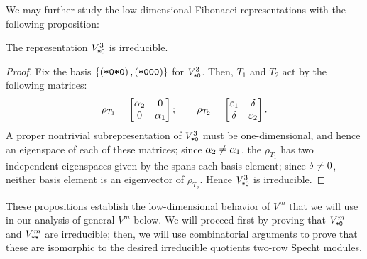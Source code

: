 \documentclass{amsart}
\begin{document}
We may further study the low-dimensional Fibonacci representations with the following proposition:
\begin{proposition}
  The representation \emph{$V^3_{\texttt{*}\texttt{0}}$} is irreducible.
\end{proposition}
\begin{proof}
  Fix the basis $\left\{ \left( \texttt{*}\texttt{0}\texttt{*}\texttt{0} \right), \left( \texttt{*}\texttt{0}\texttt{0}\texttt{0} \right) \right\}$ for $V^3_{\texttt{*}\texttt{0}}$.
  Then, $T_1$ and $T_2$ act by the following matrices:
\[
  \rho_{T_1} = \begin{bmatrix}
    \alpha_2 & 0\\
    0 & \alpha_1
  \end{bmatrix}; \hspace{20pt}
  \rho_{T_2} = \begin{bmatrix}
    \varepsilon_1 & \delta\\
    \delta & \varepsilon_2
  \end{bmatrix}.
\]
  A proper nontrivial subrepresentation of $V_{\texttt{*}\texttt{0}}^3$ must be one-dimensional, and hence an eigenspace of each of these matrices;
  since $\alpha_2 \neq \alpha_1$, the $\rho_{T_1}$ has two independent eigenspaces given by the spans each basis element; since $\delta \neq 0$, neither basis element is an eigenvector of $\rho_{T_2}$.
  Hence $V^3_{\texttt{*}\texttt{0}}$ is irreducible.
\end{proof}

These propositions establish the low-dimensional behavior of $V^m$ that we will use in our analysis of general $V^m$ below.
We will proceed first by proving that $V^m_{\texttt{*}\texttt{0}}$ and $V^m_{\texttt{*}\texttt{*}}$ are irreducible;
then, we will use combinatorial arguments to prove that these are isomorphic to the desired irreducible quotients two-row Specht modules.
\end{document}
